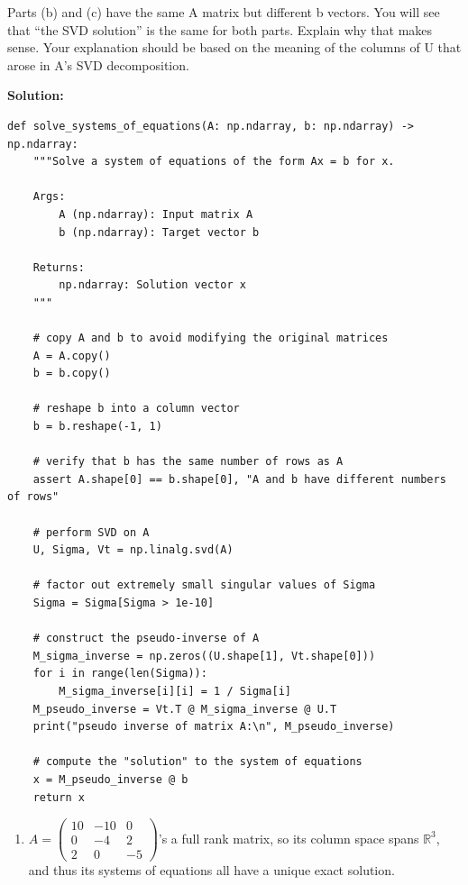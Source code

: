 \documentclass[conference,onecolumn]{IEEEtran}
\begin{document}
\begin{enumerate}[label=\arabic{enumi}.]
          Parts (b) and (c) have the same A matrix but different b vectors.
          You will see that “the SVD solution” is the same for both parts.
          Explain why that makes sense.
          Your explanation should be based on the meaning of the columns of U that arose in A's SVD decomposition.

          \textbf{Solution:}
          \begin{lstlisting}
def solve_systems_of_equations(A: np.ndarray, b: np.ndarray) -> np.ndarray:
    """Solve a system of equations of the form Ax = b for x.

    Args:
        A (np.ndarray): Input matrix A
        b (np.ndarray): Target vector b

    Returns:
        np.ndarray: Solution vector x
    """

    # copy A and b to avoid modifying the original matrices
    A = A.copy()
    b = b.copy()

    # reshape b into a column vector
    b = b.reshape(-1, 1)

    # verify that b has the same number of rows as A
    assert A.shape[0] == b.shape[0], "A and b have different numbers of rows"

    # perform SVD on A
    U, Sigma, Vt = np.linalg.svd(A)

    # factor out extremely small singular values of Sigma
    Sigma = Sigma[Sigma > 1e-10]

    # construct the pseudo-inverse of A
    M_sigma_inverse = np.zeros((U.shape[1], Vt.shape[0]))
    for i in range(len(Sigma)):
        M_sigma_inverse[i][i] = 1 / Sigma[i]
    M_pseudo_inverse = Vt.T @ M_sigma_inverse @ U.T
    print("pseudo inverse of matrix A:\n", M_pseudo_inverse)

    # compute the "solution" to the system of equations
    x = M_pseudo_inverse @ b
    return x
          \end{lstlisting}

          \begin{enumerate}
              \item $A =
                        \begin{pmatrix}
                            10 & -10 & 0  \\
                            0  & -4  & 2  \\
                            2  & 0   & -5
                        \end{pmatrix}$'s a full rank matrix, so its column space spans $\mathbb{R}^3$, and thus its systems of equations all have a unique exact solution.


\end{enumerate}
\end{enumerate}
\end{document}
